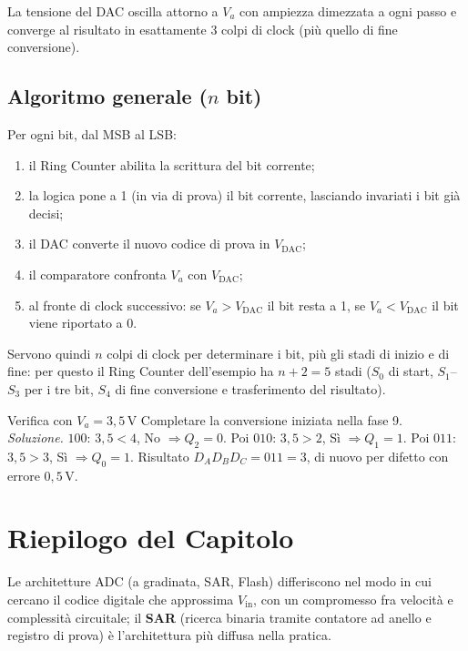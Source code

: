 \noindent La tensione del DAC oscilla attorno a $V_a$ con ampiezza dimezzata a ogni passo e
converge al risultato in esattamente 3 colpi di clock (più quello di fine conversione).

\subsection*{Algoritmo generale ($n$ bit)}

Per ogni bit, dal MSB al LSB:
\begin{enumerate}[leftmargin=1.8em, itemsep=2pt]
    \item il Ring Counter abilita la scrittura del bit corrente;
    \item la logica pone a 1 (in via di prova) il bit corrente, lasciando invariati i bit già
          decisi;
    \item il DAC converte il nuovo codice di prova in $V_{\text{DAC}}$;
    \item il comparatore confronta $V_a$ con $V_{\text{DAC}}$;
    \item al fronte di clock successivo: se $V_a > V_{\text{DAC}}$ il bit resta a 1, se
          $V_a < V_{\text{DAC}}$ il bit viene riportato a 0.
\end{enumerate}
Servono quindi $n$ colpi di clock per determinare i bit, più gli stadi di inizio e di fine:
per questo il Ring Counter dell'esempio ha $n+2 = 5$ stadi ($S_0$ di start, $S_1$--$S_3$ per
i tre bit, $S_4$ di fine conversione e trasferimento del risultato).

\begin{esercizio}{Verifica con $V_a = 3{,}5$\,V}
Completare la conversione iniziata nella fase 9.\\[0.3em]
\emph{Soluzione.} $100$: $3{,}5 < 4$, No $\Rightarrow Q_2=0$. Poi $010$: $3{,}5 > 2$, Sì
$\Rightarrow Q_1=1$. Poi $011$: $3{,}5 > 3$, Sì $\Rightarrow Q_0=1$. Risultato
$D_AD_BD_C = 011 = 3$, di nuovo per difetto con errore $0{,}5$\,V.
\end{esercizio}

\section*{Riepilogo del Capitolo}

\begin{important}
Le architetture ADC (a gradinata, SAR, Flash) differiscono nel modo in cui cercano il codice digitale che approssima $V_{\text{in}}$, con un compromesso fra velocità e complessità circuitale; il \textbf{SAR} (ricerca binaria tramite contatore ad anello e registro di prova) è l'architettura più diffusa nella pratica.
\end{important}

